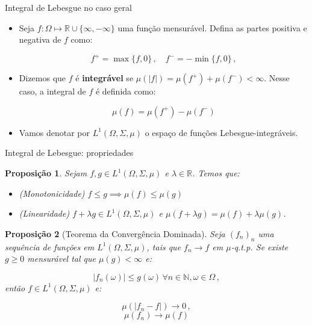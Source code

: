 \documentclass[11pt]{beamer}
\newtheorem{proposition}{Proposição}
\begin{document}
	\begin{frame}{Integral de Lebesgue no caso geral}
	\begin{itemize}
		\item 		Seja $f:\Omega \mapsto \mathbb{R}\cup\{\infty,-\infty\}$ uma função mensurável. Defina as partes positiva e negativa de $f$ como:
		
		$$f^+ = \max\{f,0\} \,, \quad f^-  = - \min\{f,0\}\, ,$$
		

		\item Dizemos que $f$ é \textbf{integrável} se $\mu(|f|) = \mu(f^+) + \mu(f^-) < \infty$. Nesse caso, a integral de $f$ é definida como:
		
		$$\mu(f) = \mu(f^+)-\mu(f^-)$$
		
		\item Vamos denotar por $L^1(\Omega, \Sigma,\mu)$ o espaço de funções Lebesgue-integráveis.
		
	\end{itemize}
		
	\end{frame}
	\begin{frame}{Integral de Lebesgue: propriedades}
	\begin{proposition}
		Sejam $f,g \in L^1(\Omega,\Sigma, \mu)$ e $\lambda \in \mathbb{R}$. Temos que:
		\begin{itemize}
			\item[1] (Monotonicidade) $f \leq g \implies \mu(f)\leq \mu(g)$
			\item[2] (Linearidade) $f + \lambda g \in  L^1(\Omega,\Sigma, \mu)$ e $\mu(f+\lambda g) = \mu(f)+\lambda\mu(g)$.
		\end{itemize}
	\end{proposition}
	\begin{proposition}[Teorema da Convergência Dominada]
		Seja $(f_n)_n$ uma sequência de funções em $ L^1(\Omega,\Sigma, \mu)$, tais que $f_n \to f$ em $\mu$-q.t.p. Se existe $g\geq 0$ mensurável  tal que $\mu(g) < \infty$ e:
		
		$$|f_n(\omega)|\leq g(\omega)\,  \forall n \in \mathbb{N}, \omega \in \Omega\, ,$$
		então  $f \in L^1(\Omega,\Sigma, \mu)$ e: 
		
		$$\mu(|f_n-f|)\to 0 \,,$$ $$ \mu(f_n) \to \mu(f)$$
	\end{proposition}
	\end{frame}
	
\end{document}
